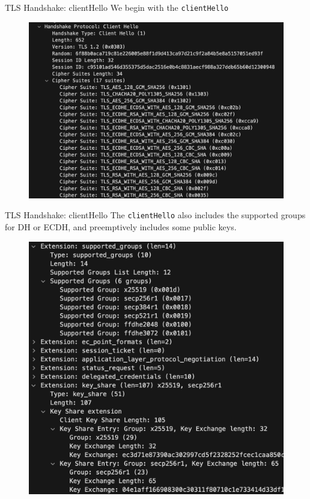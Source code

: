 \documentclass{beamer}
\begin{document}
\begin{frame}{TLS Handshake: clientHello}
    We begin with the \texttt{clientHello}
    \begin{figure}
        \centering
        \includegraphics[width=0.7\linewidth]{figures/cipher_suites.png}
    \end{figure}
\end{frame}

\begin{frame}{TLS Handshake: clientHello}
    The \texttt{clientHello} also includes the supported groups for DH or ECDH, and preemptively includes some public keys.
    \begin{figure}
        \centering
        \includegraphics[width=0.7\linewidth]{figures/ch_dh.png}
    \end{figure}
\end{frame}
\end{document}

